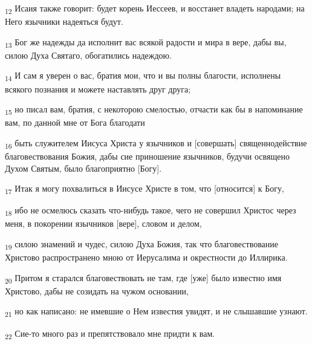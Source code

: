 \begin{tcolorbox}
\textsubscript{12} Исаия также говорит: будет корень Иессеев, и восстанет владеть народами; на Него язычники надеяться будут.
\end{tcolorbox}
\begin{tcolorbox}
\textsubscript{13} Бог же надежды да исполнит вас всякой радости и мира в вере, дабы вы, силою Духа Святаго, обогатились надеждою.
\end{tcolorbox}
\begin{tcolorbox}
\textsubscript{14} И сам я уверен о вас, братия мои, что и вы полны благости, исполнены всякого познания и можете наставлять друг друга;
\end{tcolorbox}
\begin{tcolorbox}
\textsubscript{15} но писал вам, братия, с некоторою смелостью, отчасти как бы в напоминание вам, по данной мне от Бога благодати
\end{tcolorbox}
\begin{tcolorbox}
\textsubscript{16} быть служителем Иисуса Христа у язычников и [совершать] священнодействие благовествования Божия, дабы сие приношение язычников, будучи освящено Духом Святым, было благоприятно [Богу].
\end{tcolorbox}
\begin{tcolorbox}
\textsubscript{17} Итак я могу похвалиться в Иисусе Христе в том, что [относится] к Богу,
\end{tcolorbox}
\begin{tcolorbox}
\textsubscript{18} ибо не осмелюсь сказать что-нибудь такое, чего не совершил Христос через меня, в покорении язычников [вере], словом и делом,
\end{tcolorbox}
\begin{tcolorbox}
\textsubscript{19} силою знамений и чудес, силою Духа Божия, так что благовествование Христово распространено мною от Иерусалима и окрестности до Иллирика.
\end{tcolorbox}
\begin{tcolorbox}
\textsubscript{20} Притом я старался благовествовать не там, где [уже] было известно имя Христово, дабы не созидать на чужом основании,
\end{tcolorbox}
\begin{tcolorbox}
\textsubscript{21} но как написано: не имевшие о Нем известия увидят, и не слышавшие узнают.
\end{tcolorbox}
\begin{tcolorbox}
\textsubscript{22} Сие-то много раз и препятствовало мне придти к вам.
\end{tcolorbox}
